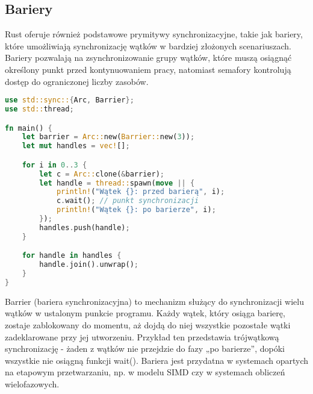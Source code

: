 \subsection{Bariery}
Rust oferuje również podstawowe prymitywy synchronizacyjne, takie jak bariery, które umożliwiają synchronizację wątków w bardziej złożonych scenariuszach. Bariery pozwalają na zsynchronizowanie grupy wątków, które muszą osiągnąć określony punkt przed kontynuowaniem pracy, natomiast semafory kontrolują dostęp do ograniczonej liczby zasobów.
\begin{lstlisting}[language=Rust, caption=Przykład użycia bariery, label=barrier_example]
use std::sync::{Arc, Barrier};
use std::thread;

fn main() {
    let barrier = Arc::new(Barrier::new(3));
    let mut handles = vec![];

    for i in 0..3 {
        let c = Arc::clone(&barrier);
        let handle = thread::spawn(move || {
            println!("Wątek {}: przed barierą", i);
            c.wait(); // punkt synchronizacji
            println!("Wątek {}: po barierze", i);
        });
        handles.push(handle);
    }

    for handle in handles {
        handle.join().unwrap();
    }
}
\end{lstlisting}
Barrier (bariera synchronizacyjna) to mechanizm służący do synchronizacji wielu wątków w ustalonym punkcie programu. Każdy wątek, który osiąga barierę, zostaje zablokowany do momentu, aż dojdą do niej wszystkie pozostałe wątki zadeklarowane przy jej utworzeniu. Przykład ten przedstawia trójwątkową synchronizację - żaden z wątków nie przejdzie do fazy „po barierze”, dopóki wszystkie nie osiągną funkcji wait(). Bariera jest przydatna w systemach opartych na etapowym przetwarzaniu, np. w modelu SIMD czy w systemach obliczeń wielofazowych.
